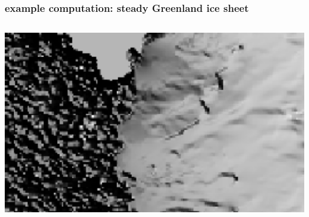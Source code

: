 \documentclass[hide notes,intlimits]{beamer}
\begin{document}
\begin{frame}
  \frametitle{example computation: steady Greenland ice sheet}

\begin{columns}
\begin{column}{0.6\textwidth}
\includegraphics[width=1.05\textwidth]{insetinset}


\end{column}
\end{columns}
\end{frame}
\end{document}
